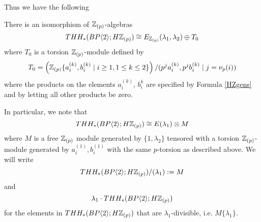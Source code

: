 Thus we have the following
\begin{cor}\label{BHZ}
There is an isomorphism of $\mathbb{Z}_{(p)}$-algebras
\[ THH_*(BP\langle 2 \rangle;H\mathbb{Z}_{(p)})\cong E_{\mathbb{Z}_{(p)}}(\lambda_1,\lambda_2)\oplus T_0\]
where $T_0$ is a torsion $\mathbb{Z}_{(p)}$-module defined by 
\[ T_0=\left (\mathbb{Z}_{(p)}\{a_i^{(k)},b_i^{(k)} \mid  i \ge 1, 1\le k\le 2\} \right )/(p^ja_i^{(k)}, p^jb_i^{(k)} \mid j=\nu_p(i) ) \]
where the products on the elements $a_i^{(k)}$, $b_i^k$ are specified by Formula \eqref{HZgens} and by letting all other products be zero. 
\end{cor}
\begin{rem}
In particular, we note that 
\[ THH_*(BP\langle 2 \rangle;H\mathbb{Z}_{(p)}) \cong E(\lambda_1)\otimes M \]
where $M$ is a free $\mathbb{Z}_{(p)}$ module generated by $\{1, \lambda_2\}$ tensored with a torsion $\mathbb{Z}_{(p)}$-module generated by $a^{(1)}_i, b_i^{(1)}$ with the same $p$-torsion as described above. We will write 
\[ THH_*(BP\langle 2 \rangle;H\mathbb{Z}_{(p)})/(\lambda_1) := M \] 
and  
\[ \lambda_1 \cdot THH_*(BP\langle 2 \rangle;H\mathbb{Z}_{(p)}) \]
for the elements in $THH_*(BP\langle 2 \rangle;H\mathbb{Z}_{(p)})$ that are $\lambda_1$-divisible, i.e. $M\{\lambda_1\}$. 
\end{rem} 



